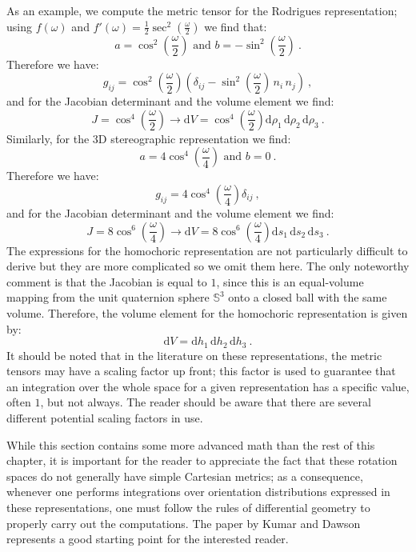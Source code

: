 As an example, we compute the metric tensor for the Rodrigues representation; using $f(\omega)$ and $f'(\omega) = \frac{1}{2}\sec^2(\frac{\omega}{2})$ we find that:
\[
	a=\cos^2\left(\frac{\omega}{2}\right)\text{ and } b=-\sin^2\left(\frac{\omega}{2}\right)\ .
\]
Therefore we have:
\begin{equation}
	g_{ij} = \cos^2\left(\frac{\omega}{2}\right)\left(\delta_{ij}-\sin^2\left(\frac{\omega}{2}\right)\,n_i\,n_j\right)\ ,\label{\chabbr:eq:metricRodrigues}
\end{equation}
and for the Jacobian determinant and the volume element we find:
\[
	J = \cos^4\left(\frac{\omega}{2}\right)\rightarrow \mathrm{d}V = \cos^4\left(\frac{\omega}{2}\right) \mathrm{d}\rho_1\,\mathrm{d}\rho_2\,\mathrm{d}\rho_3\ .
\]
Similarly, for the 3D stereographic representation we find:
\[
	a=4\cos^4\left(\frac{\omega}{4}\right)\text{ and } b=0\ .
\]
Therefore we have:
\begin{equation}
	g_{ij} = 4\cos^4\left(\frac{\omega}{4}\right)\delta_{ij}\ ,\label{\chabbr:eq:metricStereographic}
\end{equation}
and for the Jacobian determinant and the volume element we find:
\[
	J = 8\cos^6\left(\frac{\omega}{4}\right)\rightarrow \mathrm{d}V = 8\cos^6\left(\frac{\omega}{4}\right) \mathrm{d}s_1\,\mathrm{d}s_2\,\mathrm{d}s_3\ .
\]
The expressions for the homochoric representation are not particularly difficult to derive but they are more complicated so we omit them here. The only noteworthy comment is that the Jacobian is equal to $1$, since this is an equal-volume mapping from the unit quaternion sphere $\mathbb{S}^3$ onto a closed ball with the same volume.  Therefore, the volume element for the homochoric representation is given by:
\[
	\mathrm{d}V =  \mathrm{d}h_1\,\mathrm{d}h_2\,\mathrm{d}h_3\ .
\]
It should be noted that in the literature on these representations, the metric tensors may have a scaling factor up front; this factor is used to guarantee that an integration over the whole space for a given representation has a specific value, often $1$, but not always.  The reader should be aware that there are several different potential scaling factors in use.

While this section contains some more advanced math than the rest of this chapter, it is important for the reader to appreciate the fact that these rotation spaces do not generally have simple Cartesian metrics; as a consequence, whenever one performs integrations over orientation distributions expressed in these representations, one must follow the rules of differential geometry to properly carry out the computations.  The paper by Kumar and Dawson \cite{kumar1998a} represents a good starting point for the interested reader.


